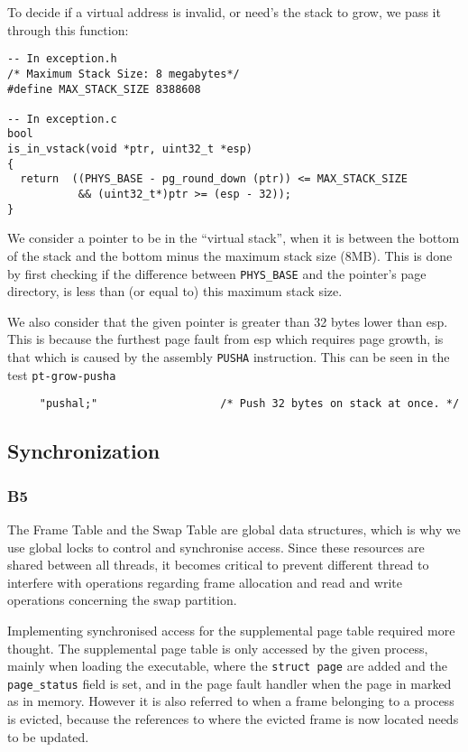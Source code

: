 \documentclass[a4wide, 11pt]{article}
\newcommand{\tx}{\texttt}
\begin{document}
To decide if a virtual address is invalid, or need's the stack to grow, we pass it through this function:
\begin{verbatim}
-- In exception.h
/* Maximum Stack Size: 8 megabytes*/
#define MAX_STACK_SIZE 8388608

-- In exception.c
bool
is_in_vstack(void *ptr, uint32_t *esp)
{
  return  ((PHYS_BASE - pg_round_down (ptr)) <= MAX_STACK_SIZE
           && (uint32_t*)ptr >= (esp - 32));
}
\end{verbatim}

We consider a pointer to be in the ``virtual stack'', when it is between the bottom of the stack and the bottom minus the maximum stack size (8MB). This is done by first checking if the difference between \tx{PHYS\_BASE} and the pointer's page directory, is less than (or equal to) this maximum stack size.

We also consider that the given pointer is greater than 32 bytes lower than esp. This is because the furthest page fault from esp which requires page growth, is that which is caused by the assembly \tx{PUSHA} instruction. This can be seen in the test \tx{pt-grow-pusha}

\begin{verbatim}
     "pushal;"                   /* Push 32 bytes on stack at once. */
\end{verbatim}

\subsection{Synchronization}
\subsubsection{B5}

The Frame Table and the Swap Table are global data structures, which is why we use global locks to control and synchronise access. Since these resources are shared between all threads, it becomes critical to prevent different thread to interfere with operations regarding frame allocation and read and write operations concerning the swap partition.

Implementing synchronised access for the supplemental page table required more thought. The supplemental page table is only accessed by the given process, mainly when loading the executable, where the \tx{struct page} are added and the \tx{page\_status} field is set, and in the page fault handler when the page in marked as in memory. However it is also referred to when a frame belonging to a process is evicted, because the references to where the evicted frame is now located needs to be updated.
\end{document}
